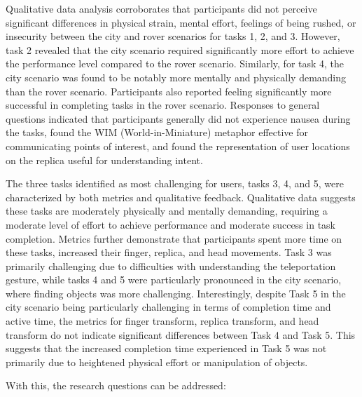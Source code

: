        Qualitative data analysis corroborates that participants did not perceive significant differences in physical strain, mental effort, feelings of being rushed, or insecurity between the city and rover scenarios for tasks 1, 2, and 3. However, task 2 revealed that the city scenario required significantly more effort to achieve the performance level compared to the rover scenario. Similarly, for task 4, the city scenario was found to be notably more mentally and physically demanding than the rover scenario. Participants also reported feeling significantly more successful in completing tasks in the rover scenario. Responses to general questions indicated that participants generally did not experience nausea during the tasks, found the WIM (World-in-Miniature) metaphor effective for communicating points of interest, and found the representation of user locations on the replica useful for understanding intent.

        The three tasks identified as most challenging for users, tasks 3, 4, and 5, were characterized by both metrics and qualitative feedback. Qualitative data suggests these tasks are moderately physically and mentally demanding, requiring a moderate level of effort to achieve performance and moderate success in task completion. Metrics further demonstrate that participants spent more time on these tasks, increased their finger, replica, and head movements. Task 3 was primarily challenging due to difficulties with understanding the teleportation gesture, while tasks 4 and 5 were particularly pronounced in the city scenario, where finding objects was more challenging. Interestingly, despite Task 5 in the city scenario being particularly challenging in terms of completion time and active time, the metrics for finger transform, replica transform, and head transform do not indicate significant differences between Task 4 and Task 5. This suggests that the increased completion time experienced in Task 5 was not primarily due to heightened physical effort or manipulation of objects.
        
        With this, the research questions can be addressed:

